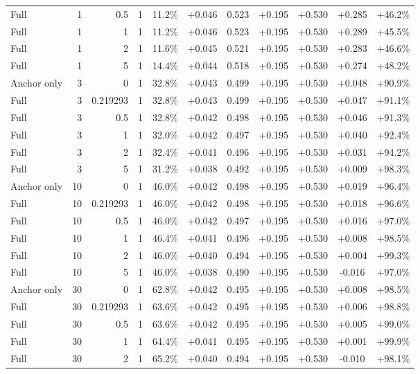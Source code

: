 \begin{table}[htbp]
\begin{tabular}{lrrrccccccc}
Full & 1 & 0.5 & 1 & 11.2\% & +0.046 & 0.523 & +0.195 & +0.530 & +0.285 & +46.2\% \\
Full & 1 & 1 & 1 & 11.2\% & +0.046 & 0.523 & +0.195 & +0.530 & +0.289 & +45.5\% \\
Full & 1 & 2 & 1 & 11.6\% & +0.045 & 0.521 & +0.195 & +0.530 & +0.283 & +46.6\% \\
Full & 1 & 5 & 1 & 14.4\% & +0.044 & 0.518 & +0.195 & +0.530 & +0.274 & +48.2\% \\
Anchor only & 3 & 0 & 1 & 32.8\% & +0.043 & 0.499 & +0.195 & +0.530 & +0.048 & +90.9\% \\
Full & 3 & 0.219293 & 1 & 32.8\% & +0.043 & 0.499 & +0.195 & +0.530 & +0.047 & +91.1\% \\
Full & 3 & 0.5 & 1 & 32.8\% & +0.042 & 0.498 & +0.195 & +0.530 & +0.046 & +91.3\% \\
Full & 3 & 1 & 1 & 32.0\% & +0.042 & 0.497 & +0.195 & +0.530 & +0.040 & +92.4\% \\
Full & 3 & 2 & 1 & 32.4\% & +0.041 & 0.496 & +0.195 & +0.530 & +0.031 & +94.2\% \\
Full & 3 & 5 & 1 & 31.2\% & +0.038 & 0.492 & +0.195 & +0.530 & +0.009 & +98.3\% \\
Anchor only & 10 & 0 & 1 & 46.0\% & +0.042 & 0.498 & +0.195 & +0.530 & +0.019 & +96.4\% \\
Full & 10 & 0.219293 & 1 & 46.0\% & +0.042 & 0.498 & +0.195 & +0.530 & +0.018 & +96.6\% \\
Full & 10 & 0.5 & 1 & 46.0\% & +0.042 & 0.497 & +0.195 & +0.530 & +0.016 & +97.0\% \\
Full & 10 & 1 & 1 & 46.4\% & +0.041 & 0.496 & +0.195 & +0.530 & +0.008 & +98.5\% \\
Full & 10 & 2 & 1 & 46.0\% & +0.040 & 0.494 & +0.195 & +0.530 & +0.004 & +99.3\% \\
Full & 10 & 5 & 1 & 46.0\% & +0.038 & 0.490 & +0.195 & +0.530 & -0.016 & +97.0\% \\
Anchor only & 30 & 0 & 1 & 62.8\% & +0.042 & 0.495 & +0.195 & +0.530 & +0.008 & +98.5\% \\
Full & 30 & 0.219293 & 1 & 63.6\% & +0.042 & 0.495 & +0.195 & +0.530 & +0.006 & +98.8\% \\
Full & 30 & 0.5 & 1 & 63.6\% & +0.042 & 0.495 & +0.195 & +0.530 & +0.005 & +99.0\% \\
Full & 30 & 1 & 1 & 64.4\% & +0.041 & 0.495 & +0.195 & +0.530 & +0.001 & +99.9\% \\
Full & 30 & 2 & 1 & 65.2\% & +0.040 & 0.494 & +0.195 & +0.530 & -0.010 & +98.1\% \\

\end{tabular}
\end{table}
